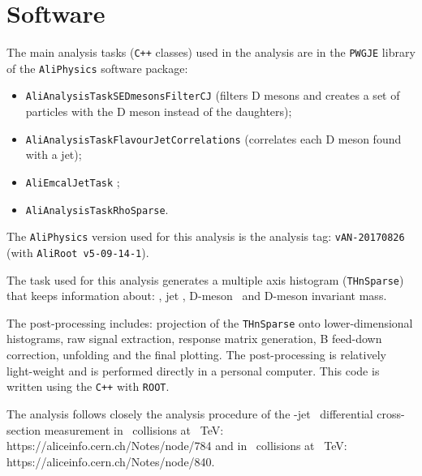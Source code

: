 \section{Software}

The main analysis tasks (\texttt{C++} classes) used in the analysis are in the \texttt{PWGJE} library of the \texttt{AliPhysics} software package:
\begin{itemize}
\item \texttt{AliAnalysisTaskSEDmesonsFilterCJ} (filters D mesons and creates a set of particles with the D meson instead of the daughters);
\item \texttt{AliAnalysisTaskFlavourJetCorrelations} (correlates each D meson found with a jet);
\item \texttt{AliEmcalJetTask} ;%
\item \texttt{AliAnalysisTaskRhoSparse}. %
\end{itemize}
The \texttt{AliPhysics} version used for this analysis is the analysis tag: \texttt{vAN-20170826} (with \texttt{AliRoot v5-09-14-1}).%

The task used for this analysis generates a multiple axis histogram (\texttt{THnSparse}) that keeps information about: \zpar, jet \pt, D-meson \pt\ and D-meson invariant mass.

The post-processing includes: projection of the \texttt{THnSparse} onto lower-dimensional histograms, raw signal extraction, response matrix generation, B feed-down correction, unfolding and the final plotting.
The post-processing is relatively light-weight and is performed directly in a personal computer. This code is written using the \texttt{C++} with \texttt{ROOT}.

The analysis follows closely the analysis procedure of the \Dzero-jet \pt\ differential cross-section measurement in \pPb\ collisions at ~TeV: https://aliceinfo.cern.ch/Notes/node/784 and in \pp\ collisions at ~TeV: https://aliceinfo.cern.ch/Notes/node/840.

